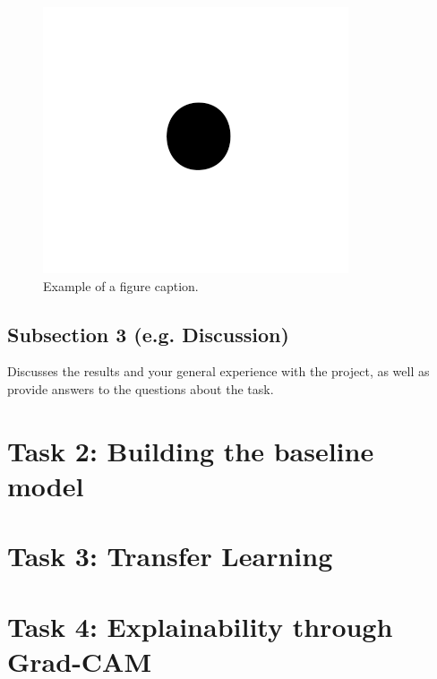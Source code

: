 \documentclass[conference]{IEEEtran}
\begin{document}
\begin{figure}[htbp]
\centerline{\includegraphics{fig1.png}}
\caption{Example of a figure caption.}
\label{fig:example}
\end{figure}
\subsection{Subsection 3 (e.g. Discussion)}
Discusses the results and your general experience with the project, as well as provide answers to the questions about the task.
\section{Task 2: Building the baseline model}
\section{Task 3: Transfer Learning}
\section{Task 4: Explainability through Grad-CAM}
\end{document}
